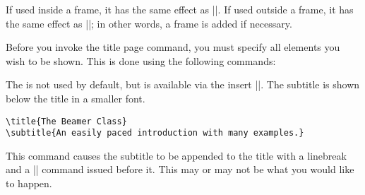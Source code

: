 \begin{command}{\maketitle}
  \beamernote
  If used inside a frame, it has the same effect as |\titlepage|. If
  used outside a frame, it has the same effect as
  |\frame{\titlepage}|; in other words, a frame is added if necessary.
\end{command}


Before you invoke the title page command, you must specify all
elements you wish to be shown. This is done using the following
commands:


\begin{command}{\subtitle{}}
  The  is not used by default, but is available
  via the insert |\insertshortsubtitle|. The subtitle is shown below
  the title in a smaller font.
  \example
\begin{verbatim}
\title{The Beamer Class}
\subtitle{An easily paced introduction with many examples.}
\end{verbatim}

  \articlenote
  This command causes the subtitle to be appended to the title with a
  linebreak and a |\normalsize| command issued before it. This may or
  may not be what you would like to happen.
\end{command}


